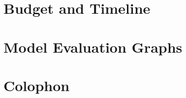 
\printbibliography

\clearpage

\appendix
\chapter{Budget and Timeline}
	\label{app:budget-timeline}
	
	
\chapter{Model Evaluation Graphs}
	\label{app:model-evaluation-graphs}
	

\backmatter
\chapter{Colophon}
	



